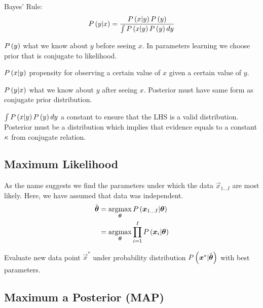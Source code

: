 Bayes' Rule:
	\begin{align*}
	\P{y|x}=\frac{\P{x|y}\P{y}}{\int\P{x|y}\P{y}dy}
	\end{align*}
\begin{description}[leftmargin=0cm]
	\item[Prior] $\P{y}$ what we know about $y$ before seeing $x$. In parameters learning we choose prior that is conjugate to likelihood.
	\item[Likelihood] $\P{x|y}$ propensity for observing a certain value of $x$ given a certain value of $y$.
	\item[Posterior] $\P{y|x}$ what we know about $y$ after seeing $x$. Posterior must have same form as conjugate prior distribution.
	\item[Evidence] $\int\P{x|y}\P{y}dy$ a constant to ensure that the LHS is a valid distribution. Posterior must be a distribution which implies that evidence equals to a constant $\ka$ from conjugate relation.
\end{description}

\subsection{Maximum Likelihood}

\begin{description}[leftmargin=0cm]
\item[Fitting] As the name suggests we find the parameters under which the data $\vec{x}_{1\dots I}$ are most likely. Here, we have assumed that data was independent.
	\begin{align*}
	\hat{\vec{\th}}&=\argmax_{\vec{\th}}\P{\vec{x}_{1\dots I}|\vec{\th}} \\
	&=\argmax_{\vec{\th}}\prod_{i=1}^I\P{\vec{x}_i|\vec{\th}}
	\end{align*}
\item[Predictive Density] Evaluate new data point $\vec{x}^*$ under probability distribution $\P{\vec{x}^*|\hat{\vec{\th}}}$ with best parameters.
\end{description}

\subsection{Maximum a Posterior (MAP)}

